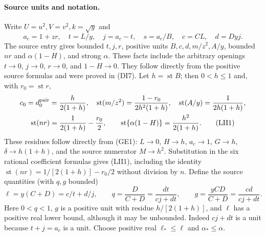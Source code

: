 \paragraph{Source units and notation.}
Write $U=u^2,V=v^2,k=\sqrt y$ and
\[
 a_c=1+zr,\quad t=L/y,\quad j=a_c-t,\quad s=a_c/B,
 \quad c=CL,\quad d=Dyj.
\]
The source entry gives bounded $t,j,r$, positive units $B,c,d,m/z^2,A/y$,
bounded $nr$ and $\alpha(1-H)$, and strong $\alpha$.
These facts include the arbitrary openings $t\to0$, $j\to0$,
$r\to0$, and $1-H\to0$.  They follow directly from the positive
source formulas and were proved in (DI7).  Let $h=\operatorname{st}B$;
then $0<h\leq1$ and, with $r_0=\operatorname{st}r$,
\[
\begin{gathered}
 c_0=d_0^{\rm pair}=\frac{h}{2(1+h)},\quad
 \operatorname{st}(m/z^2)=\frac{1-r_0}{2h^2(1+h)},\quad
 \operatorname{st}(A/y)=\frac1{2h(1+h)},\\
 \operatorname{st}(nr)=\frac1{2(1+h)}-\frac{r_0}{2},\qquad
 \operatorname{st}\{\alpha(1-H)\}=\frac{h^2}{2(1+h)}.
                                                        \tag{LII1}
\end{gathered}
\]
These residues follow directly from (GE1): $L\to0$, $H\to h$,
$a_c\to1$, $G\to h$, $\delta\to h(1+h)$, and the source
numerator $M\to h^2$.  Substitution in the six rational coefficient
formulas gives (LII1), including the identity
$\operatorname{st}(nr)=1/[2(1+h)]-r_0/2$ without division by $n$.
Define the source quantities (with $q,g$ bounded)
\[
 \ell=y(C+D)=c/t+d/j,\qquad
 q=\frac{D}{C+D}=\frac{dt}{cj+dt},\qquad
 g=\frac{yCD}{C+D}=\frac{cd}{cj+dt}.
\]
Here $0<q<1$, $g$ is a positive unit with residue $h/[2(1+h)]$,
and $\ell$ has a positive real lower bound, although it may be
unbounded.  Indeed $cj+dt$ is a unit because $t+j=a_c$ is a unit.
Choose positive real $\ell_*\leq\ell$ and
$\alpha_*\leq\alpha$.

